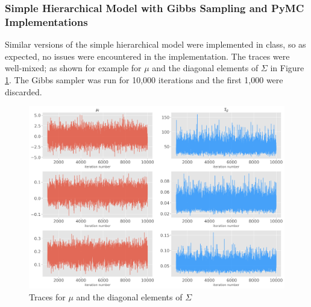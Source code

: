\documentclass[paper=a4, fontsize=11pt]{scrartcl}
\begin{document}
\subsubsection{Simple Hierarchical Model with Gibbs Sampling and PyMC Implementations}
Similar versions of the simple hierarchical model were implemented in class, so as expected, no issues were encountered in the implementation. The traces were well-mixed; as shown for example for $\mu$ and the diagonal elements of $\Sigma$ in Figure  \ref{traces}. The Gibbs sampler was run for 10,000 iterations and the first 1,000 were discarded.\\

\begin{figure}[!htb]\label{traces}
\centering
\includegraphics[width=1\textwidth]{project/writeup/traces_simple_model.png}
\caption{Traces for $\mu$ and the diagonal elements of $\Sigma$}
\end{figure}
\end{document}
